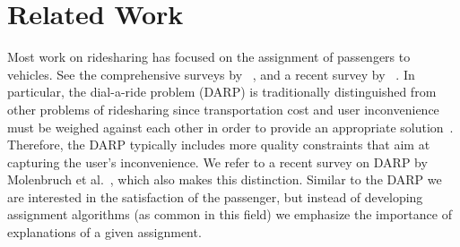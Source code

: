 \documentclass[letterpaper]{article} %
\begin{document}
%
%
%






\section{Related Work}



Most work on ridesharing has focused on the assignment of passengers to vehicles. See the comprehensive surveys by \citeauthor{parragh2008a}~\cite{parragh2008a,parragh2008b}, and a recent survey by \citeauthor{psaraftis2016dynamic}~\cite{psaraftis2016dynamic}.
In particular, the dial-a-ride problem (DARP) is traditionally distinguished from other problems of ridesharing since transportation cost and user inconvenience must be weighed against each other in order to provide an appropriate solution~\cite{cordeau2003tabu}. Therefore, the DARP typically includes more quality constraints that aim at capturing the user's inconvenience. We refer to a recent survey on DARP by Molenbruch et al.~\cite{molenbruch2017}, which also makes this distinction.
Similar to the DARP we are interested in the satisfaction of the passenger, but instead of developing assignment algorithms (as common in this field) we emphasize the importance of explanations of a given assignment.
\end{document}
